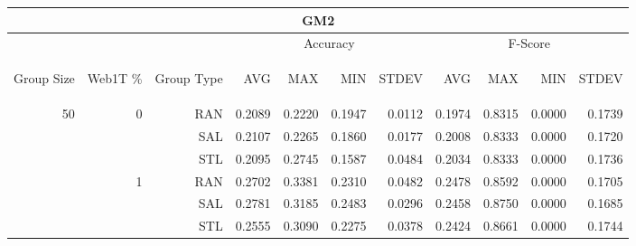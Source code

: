 \begin{center}
\begin{table}[htbp] 
 \begin{center}
\begin{tabular}{ | r | r | r | r | r | r | r | r | r | r | r |}
\hline
\multicolumn{11}{|c|}{GM2}\\
\hline
 & & & \multicolumn{4}{|c|}{Accuracy} & \multicolumn{4}{|c|}{F-Score}\\ \cline{4-11}
\begin{sideways}Group Size\end{sideways} & \begin{sideways}Web1T \%\end{sideways} & \begin{sideways}Group Type\end{sideways} & \begin{sideways}AVG\end{sideways} & \begin{sideways}MAX\end{sideways} & \begin{sideways}MIN\end{sideways} & \begin{sideways}STDEV\end{sideways} & \begin{sideways}AVG\end{sideways} & \begin{sideways}MAX\end{sideways} & \begin{sideways}MIN\end{sideways} & \begin{sideways}STDEV\end{sideways}\\
\hline
\multirow{15}{*}{50}
 & \multirow{3}{*}{0} & RAN & 0.2089 & 0.2220 & 0.1947 & 0.0112 & 0.1974 & 0.8315 & 0.0000 & 0.1739\\ \cline{3-11}
 &   & SAL & 0.2107 & 0.2265 & 0.1860 & 0.0177 & 0.2008 & 0.8333 & 0.0000 & 0.1720\\ \cline{3-11}
 &   & STL & 0.2095 & 0.2745 & 0.1587 & 0.0484 & 0.2034 & 0.8333 & 0.0000 & 0.1736\\ \cline{2-11}
 & \multirow{3}{*}{1} & RAN & 0.2702 & 0.3381 & 0.2310 & 0.0482 & 0.2478 & 0.8592 & 0.0000 & 0.1705\\ \cline{3-11}
 &   & SAL & 0.2781 & 0.3185 & 0.2483 & 0.0296 & 0.2458 & 0.8750 & 0.0000 & 0.1685\\ \cline{3-11}
 &   & STL & 0.2555 & 0.3090 & 0.2275 & 0.0378 & 0.2424 & 0.8661 & 0.0000 & 0.1744\\ \cline{2-11}

\end{tabular}
\end{center}
\end{table}
\end{center}
